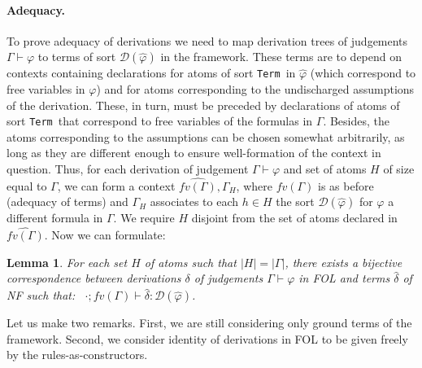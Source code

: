 \documentclass[copyright,creativecommons]{eptcs}
\newtheorem{lemma}{Lemma}
\newcounter{s}
\newcommand{\typing}[2]{\ensuremath{#1 : #2}}
\newcommand{\emptyCtx}{\cdot}
\newcommand{\tyjdgmnt}[5]{\ensuremath{#1;#2\vdash \typing{#4}{#5}}}
\newcommand{\prf}{\ensuremath{\mathcal{D}}}
\newcommand{\Trm}{\texttt{Term}}
\begin{document}
\paragraph{Adequacy.}
To prove adequacy of derivations we need to map derivation trees of judgements $\Gamma \vdash \varphi$ to terms  of sort $\prf(\hat{\varphi})$ in the framework. 
These terms are to depend on contexts containing declarations for atoms of sort \Trm\ in $\hat{\varphi}$ (which correspond to free variables in $\varphi$) and for atoms corresponding to the undischarged assumptions of the derivation. 
These, in turn, must be preceded by declarations of atoms of sort \Trm\ that correspond to free variables of the formulas in $\Gamma$.
Besides, the atoms corresponding to the assumptions can be chosen somewhat arbitrarily, as long as they are different enough to ensure well-formation of the context in question.
Thus, for each derivation of judgement $\Gamma \vdash \varphi$ and set of atoms $H$ of size equal to $\Gamma$, we can form a context $\widehat{fv(\Gamma)}, \Gamma_H$,  where $\widehat{fv(\Gamma)}$ is as before (adequacy of terms) and $\Gamma_H$ associates to each $h \in H$ the sort $\prf(\hat{\varphi})$ for $\varphi$ a different formula in $\Gamma$.
We require $H$ disjoint from the set of atoms declared in $\widehat{fv(\Gamma)}$. 
Now we can formulate:

\begin{lemma}
For each set $H$ of atoms such that $|H| = |\Gamma|$, there exists a bijective correspondence between derivations $\delta$ of judgements $\Gamma \vdash \varphi$ in FOL and terms $\hat{\delta}$ of NF such that: \ \tyjdgmnt{\emptyCtx}{\widehat{fv(\Gamma)}}{\emptyCtx}{\hat{\delta}}{\prf(\hat{\varphi})}.
\end{lemma}

\noindent
Let us make two remarks. First, we are still considering only ground terms of the framework.
Second,  we consider identity of derivations in FOL to be given freely by the rules-as-constructors.
\end{document}
